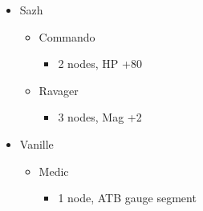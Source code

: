 	\begin{menu}
		\begin{itemize}
			\crystarium
			\begin{itemize}
				\item Sazh
				      \begin{itemize}
					      \item Commando
					            \begin{itemize}
						            \item 2 nodes, HP +80
					            \end{itemize}
					      \item Ravager
					            \begin{itemize}
						            \item 3 nodes, Mag +2
					            \end{itemize}
				      \end{itemize}
				\item Vanille
				      \begin{itemize}
					      \item Medic
					            \begin{itemize}
						            \item 1 node, ATB gauge segment
					            \end{itemize}
				      \end{itemize}
			\end{itemize}
		\end{itemize}
	\end{menu}
\renewcommand{\first}{[1] Slash \& Burn (\rav/\com)}
\renewcommand{\second}{[2] Lifeguard (\med/\sen)}
\renewcommand{\third}{[3] Divide \& Conquer (\sab/\com)}
\renewcommand{\fourth}{[4] Stumbling Block (\sab/\sen)}
